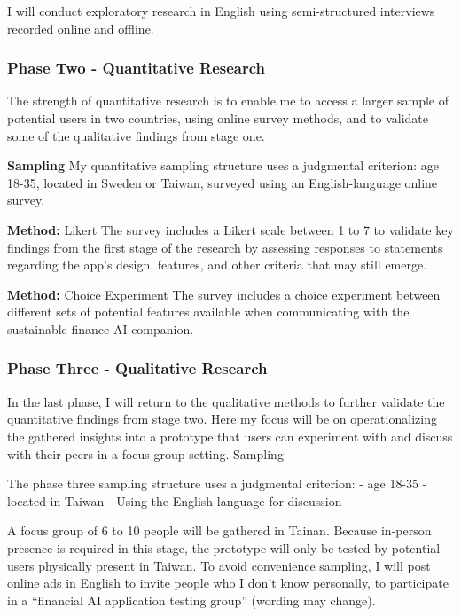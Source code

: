\documentclass[
  letterpaper,
  DIV=11,
  numbers=noendperiod]{scrartcl}
\begin{document}
I will conduct exploratory research in English using semi-structured
interviews recorded online and offline.

\subsubsection{Phase Two - Quantitative
Research}\label{phase-two---quantitative-research}

The strength of quantitative research is to enable me to access a larger
sample of potential users in two countries, using online survey methods,
and to validate some of the qualitative findings from stage one.

\textbf{Sampling} My quantitative sampling structure uses a judgmental
criterion: age 18-35, located in Sweden or Taiwan, surveyed using an
English-language online survey.

\textbf{Method:} Likert The survey includes a Likert scale between 1 to
7 to validate key findings from the first stage of the research by
assessing responses to statements regarding the app's design, features,
and other criteria that may still emerge.

\textbf{Method:} Choice Experiment The survey includes a choice
experiment between different sets of potential features available when
communicating with the sustainable finance AI companion.

\subsubsection{Phase Three - Qualitative
Research}\label{phase-three---qualitative-research}

In the last phase, I will return to the qualitative methods to further
validate the quantitative findings from stage two. Here my focus will be
on operationalizing the gathered insights into a prototype that users
can experiment with and discuss with their peers in a focus group
setting. Sampling

The phase three sampling structure uses a judgmental criterion: - age
18-35 - located in Taiwan - Using the English language for discussion

A focus group of 6 to 10 people will be gathered in Tainan. Because
in-person presence is required in this stage, the prototype will only be
tested by potential users physically present in Taiwan. To avoid
convenience sampling, I will post online ads in English to invite people
who I don't know personally, to participate in a ``financial AI
application testing group'' (wording may change).
\end{document}
